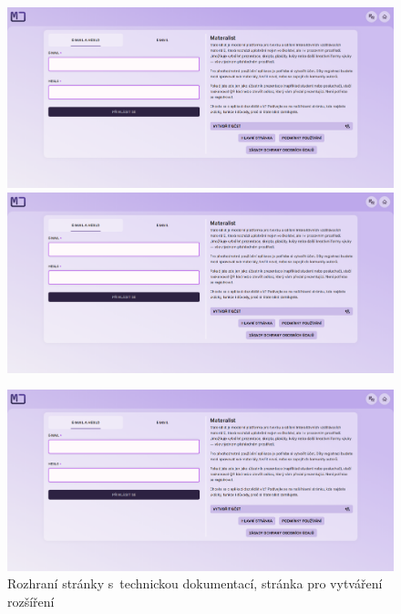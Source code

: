 \begin{figure}
\centering
\begin{minipage}{.4\textwidth}
  \centering
    \includegraphics[width=1\textwidth,page=6]{media/appendix/uzivatelskeProstredi.pdf}
\end{minipage}%
\hspace{0.1\textwidth}
\begin{minipage}{.4\textwidth}
  \centering
    \includegraphics[width=1\textwidth,page=10]{media/appendix/uzivatelskeProstredi.pdf}
\end{minipage}
\end{figure}


\begin{figure}[ht!]
    \centering
    \includegraphics[width=1\textwidth,page=8]{media/appendix/uzivatelskeProstredi.pdf}
    \caption{Rozhraní stránky s~technickou dokumentací, stránka pro vytváření rozšíření}
\end{figure}


